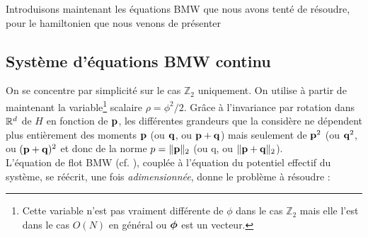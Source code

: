 \documentclass[10.5pt]{article}
\begin{document}
\begin{multicols*}{2}
Introduisons maintenant les équations BMW que nous avons tenté de résoudre, pour le hamiltonien que nous venons de présenter
\\



\subsection{Système d'équations BMW continu}


On se concentre par simplicité sur le cas  $\mathbb{Z}_2$ uniquement. On utilise à partir de maintenant la variable\footnote{Cette variable n'est pas vraiment différente de $\phi$ dans le cas $\mathbb{Z}_2$ mais elle l'est dans le cas $O(N)$ en général ou $\boldsymbol{ \phi}$ est un vecteur.} scalaire $\rho = \phi^2/2$. Grâce à l'invariance par rotation dans $\mathbb{R}^d$ de $H$ en fonction de ${\bf p}$, les différentes grandeurs que la considère ne dépendent plus entièrement des moments ${\bf p}$ (ou ${\bf q}$, ou ${\bf p}+{\bf q}$) mais seulement de ${\bf p}^2$ (ou ${\bf q}^2$, ou $({\bf p}+{\bf q})^2$ et donc de la norme $p = \| {\bf p} \|_{2}$ (ou q, ou $\|{\bf p}+{\bf q}\|_2$). \\

L'équation de flot BMW (cf. ), couplée à l'équation du potentiel effectif du système, se réécrit, une fois \textit{adimensionnée}, donne le problème à résoudre : \\


\end{multicols*}
\end{document}
